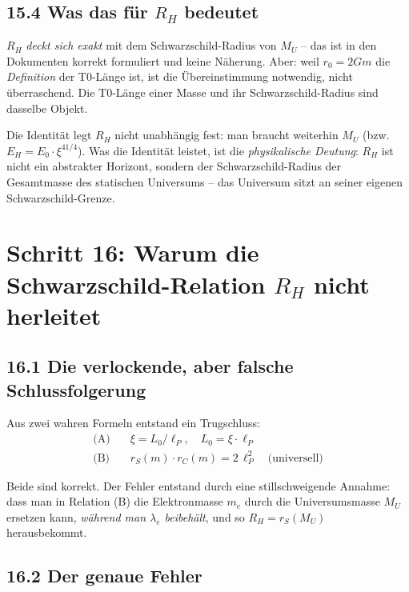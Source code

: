\subsection*{15.4 Was das für $R_H$ bedeutet}

$R_H$ \emph{deckt sich exakt} mit dem Schwarzschild-Radius von $M_U$ --
das ist in den Dokumenten korrekt formuliert und keine Näherung.
Aber: weil $r_0 = 2Gm$ die \emph{Definition} der T0-Länge ist,
ist die Übereinstimmung notwendig, nicht überraschend. Die T0-Länge
einer Masse und ihr Schwarzschild-Radius sind dasselbe Objekt.

Die Identität legt $R_H$ nicht unabhängig fest: man braucht weiterhin
$M_U$ (bzw.\ $E_H = E_0\cdot\xi^{41/4}$). Was die Identität leistet,
ist die \emph{physikalische Deutung}: $R_H$ ist nicht ein abstrakter
Horizont, sondern der Schwarzschild-Radius der Gesamtmasse des
statischen Universums -- das Universum sitzt an seiner eigenen
Schwarzschild-Grenze.

\section{Schritt 16: Warum die Schwarzschild-Relation $R_H$ nicht herleitet}

\subsection*{16.1 Die verlockende, aber falsche Schlussfolgerung}

Aus zwei wahren Formeln entstand ein Trugschluss:
\begin{align}
  \text{(A)} \quad & \xi = L_0/\ell_P, \quad L_0 = \xi\cdot\ell_P \\
  \text{(B)} \quad & r_S(m)\cdot r_C(m) = 2\,\ell_P^2 \quad\text{(universell)}
\end{align}

Beide sind korrekt. Der Fehler entstand durch eine stillschweigende
Annahme: dass man in Relation (B) die Elektronmasse $m_e$ durch die
Universumsmasse $M_U$ ersetzen kann, \emph{während man $\lambda_e$
beibehält}, und so $R_H = r_S(M_U)$ herausbekommt.

\subsection*{16.2 Der genaue Fehler}

